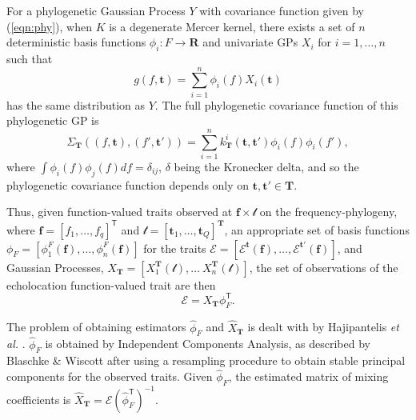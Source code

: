 \documentclass{ws-rv9x6}
\begin{document}
For a phylogenetic Gaussian Process \(Y\) with covariance function given by (\ref{eqn:phy}), when \(K\) is a degenerate Mercer kernel, there exists a set of \(n\) deterministic basis functions \(\phi_i: F \to \mathbf{R}\) and univariate GPs \(X_i\) for \(i = 1,\dots, n\) such that 
\[
g(f, \mathbf{t}) = \sum_{i = 1}^{n} \phi_i(f) X_i(\mathbf{t})
\] 
has the same distribution as \(Y\). The full phylogenetic covariance function of this phylogenetic GP is
\[
\Sigma_{\mathbf{T}}((f, \mathbf{t}), (f', \mathbf{t}')) = \sum_{i = 1}^{n}  k_{\mathbf{T}}^i(\mathbf{t}, \mathbf{t}') \phi_i(f) \phi_i(f'),
\]
where \(\int \phi_i(f) \phi_j(f) df = \delta_{ij}\), \(\delta\) being the Kronecker delta, and so the phylogenetic covariance function depends only on \(\mathbf{t}, \mathbf{t}' \in \mathbf{T}\). 

Thus, given function-valued traits observed at \(\mathbf{f} \times \mathcal{t}\) on the frequency-phylogeny, where \(\mathbf{f} = [f_1, \dots, f_q]^{\mathsf{T}}\) and \(\mathcal{t} = [\mathbf{t}_1, \dots, \mathbf{t}_Q]^{\mathbf{T}}\), an appropriate set of basis functions \(\phi_{F} = [\phi^{F}_1(\mathbf{f}), \dots, \phi^{F}_n(\mathbf{f})]\) for the traits \(\mathcal{E} = [\mathcal{E}^{\mathbf{t}}(\mathbf{f}), \dots, \mathcal{E}^{\mathbf{t}'}(\mathbf{f})]\), and Gaussian Processes, \(X_{\mathbf{T}} = [X_1^{\mathbf{T}}(\mathcal{t}), \dots\ X_n^{\mathbf{T}}(\mathcal{t})]\), the set of observations of the echolocation function-valued trait are then 
\begin{equation}
\mathcal{E} = X_{\mathbf{T}} \phi_F^{\mathsf{T}}.
\label{eqn:inv}
\end{equation}

The problem of obtaining estimators \(\hat{\phi}_F\) and \(\hat{X}_{\mathbf{T}}\) is dealt with by Hajipantelis \textit{et al.} \cite{hadjipantelis2013function}. \(\hat{\phi}_F\) is obtained by Independent Components Analysis, as described by Blaschke \& Wiscott \cite{blaschke2004cubica} after using a resampling procedure to obtain stable principal components for the observed traits. Given \(\hat{\phi}_F\), the estimated matrix of mixing coefficients is \(\hat{X}_{\mathbf{T}} = \mathcal{E} (\hat{\phi}_F^{\mathsf{T}})^{-1}\). 
\end{document}
